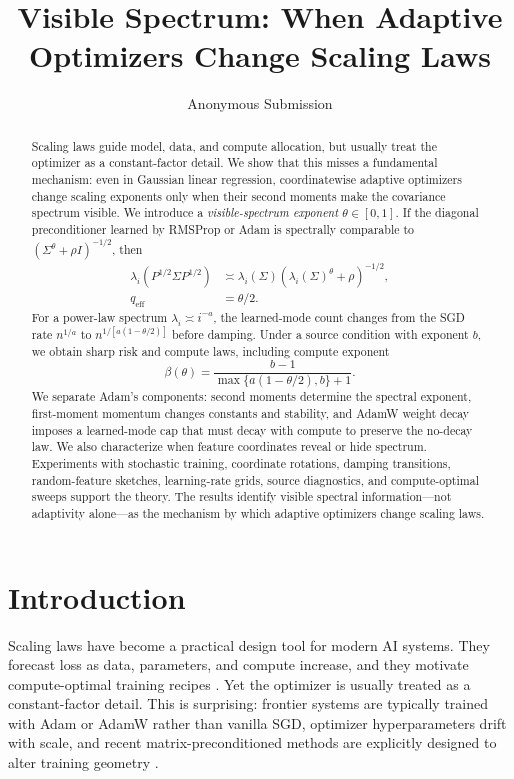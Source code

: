 \documentclass[letterpaper]{article} %
\title{Visible Spectrum: When Adaptive Optimizers Change Scaling Laws}
\author{Anonymous Submission}
\newcommand{\qeff}{q_{\mathrm{eff}}}
\begin{document}
\maketitle

\begin{abstract}
Scaling laws guide model, data, and compute allocation, but usually treat the optimizer as a constant-factor detail.  We show that this misses a fundamental mechanism: even in Gaussian linear regression, coordinatewise adaptive optimizers change scaling exponents only when their second moments make the covariance spectrum visible.  We introduce a \emph{visible-spectrum exponent} $\theta\in[0,1]$.  If the diagonal preconditioner learned by RMSProp or Adam is spectrally comparable to $(\Sigma^\theta+\rho I)^{-1/2}$, then
\[
 \begin{aligned}
 \lambda_i(P^{1/2}\Sigma P^{1/2})
 &\asymp \lambda_i(\Sigma)
   (\lambda_i(\Sigma)^\theta+\rho)^{-1/2},\\
 \qeff&=\theta/2.
 \end{aligned}
\]
For a power-law spectrum $\lambda_i\asymp i^{-a}$, the learned-mode count changes from the SGD rate $n^{1/a}$ to $n^{1/[a(1-\theta/2)]}$ before damping.  Under a source condition with exponent $b$, we obtain sharp risk and compute laws, including compute exponent
\[
 \beta(\theta)=\frac{b-1}{\max\{a(1-\theta/2),b\}+1}.
\]
We separate Adam's components: second moments determine the spectral exponent, first-moment momentum changes constants and stability, and AdamW weight decay imposes a learned-mode cap that must decay with compute to preserve the no-decay law.  We also characterize when feature coordinates reveal or hide spectrum.  Experiments with stochastic training, coordinate rotations, damping transitions, random-feature sketches, learning-rate grids, source diagnostics, and compute-optimal sweeps support the theory.  The results identify visible spectral information---not adaptivity alone---as the mechanism by which adaptive optimizers change scaling laws.
\end{abstract}

\section{Introduction}

Scaling laws have become a practical design tool for modern AI systems.  They forecast loss as data, parameters, and compute increase, and they motivate compute-optimal training recipes \cite{hestness2017deep,kaplan2020scaling,henighan2020scaling,hoffmann2022training}.  Yet the optimizer is usually treated as a constant-factor detail.  This is surprising: frontier systems are typically trained with Adam or AdamW rather than vanilla SGD, optimizer hyperparameters drift with scale, and recent matrix-preconditioned methods are explicitly designed to alter training geometry \cite{kingma2015adam,loshchilov2019decoupled,vyas2025soap,qiu2025hyperparameter}.
\end{document}
